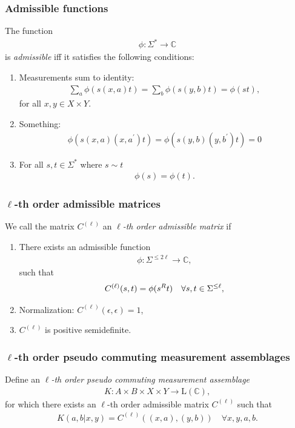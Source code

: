 \documentclass{beamer}
\def\complex{\mathbb{C}}
\newcommand{\setft}[1]{\mathrm{#1}}
\newcommand{\Lin}{\setft{L}}
\begin{document}
\begin{frame}
	\frametitle{Admissible functions}	
	The function
		\begin{align*}
			\phi : \Sigma^* \rightarrow \complex
		\end{align*}
		is \emph{admissible} iff it satisfies the following conditions:
		\begin{enumerate}
			\item Measurements sum to identity:
				\begin{align*}
					\sum_a \phi(s(x,a)t) = \sum_b \phi(s(y,b)t) = \phi(st),
				\end{align*}
				for all $x,y \in X \times Y$. 
			\item Something:
				\begin{align*}
					\phi(s(x,a)(x,a^{\prime})t) = \phi(s(y,b)(y,b^{\prime})t) = 0
				\end{align*}
			\item For all $s,t \in \Sigma^*$ where $s \sim t$
				\begin{align*}
					\phi(s) = \phi(t).
				\end{align*}
		\end{enumerate}
\end{frame}

\begin{frame}
	\frametitle{$\ell$-th order admissible matrices}
	We call the matrix $C^{(\ell)}$ an \emph{$\ell$-th order admissible matrix} if 
	\begin{enumerate}
		\item There exists an admissible function 
			\begin{align*}
				\phi : \Sigma^{\leq 2 \ell} \rightarrow \complex,
			\end{align*}
			such that 
			\begin{align*}
				C^{(\ell)}(s,t) = \phi(s^{\tiny{R}}t) \quad \forall s,t \in \Sigma^{\leq \ell},
			\end{align*}
		\item Normalization: $C^{(\ell)}(\epsilon,\epsilon) = 1$,
		\item $C^{(\ell)}$ is positive semidefinite. 
	\end{enumerate}
\end{frame}

\begin{frame}
	\frametitle{$\ell$-th order pseudo commuting measurement assemblages}
	Define an \emph{$\ell$-th order pseudo commuting measurement assemblage} 
	\begin{align*}
		K: A \times B \times X \times Y \rightarrow \Lin(\complex),
	\end{align*}
	for which there exists an $\ell$-th order admissible matrix $C^{(\ell)}$ such that 
	\begin{align*}
		K(a,b|x,y) = C^{(\ell)}((x,a),(y,b)) \quad \forall x,y,a,b. 
	\end{align*}
\end{frame}
\end{document}
